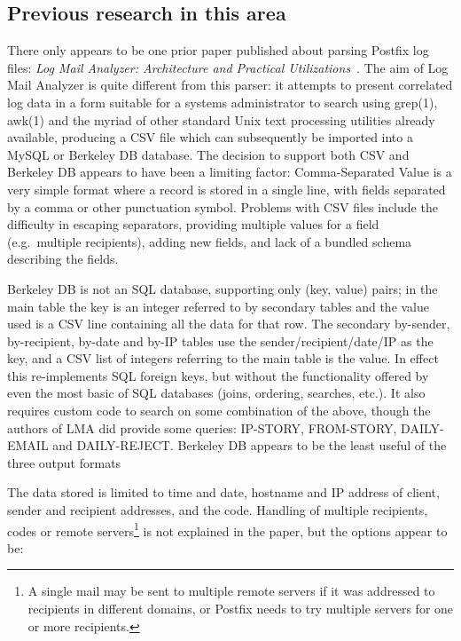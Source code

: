 \documentclass[a4paper,12pt,draft]{article}
\begin{document}
\subsection{Previous research in this area}

\label{prior art}

There only appears to be one prior paper published about parsing Postfix
log files: \textit{Log Mail Analyzer: Architecture and Practical
Utilizations\/}~\cite{log-mail-analyser}.  The aim of Log Mail Analyzer is
quite different from this parser: it attempts to present correlated log
data in a form suitable for a systems administrator to search using
grep(1), awk(1) and the myriad of other standard Unix text processing
utilities already available, producing a CSV file which can subsequently be
imported into a MySQL or Berkeley DB database.  The decision to support
both CSV and Berkeley DB appears to have been a limiting factor:
Comma-Separated Value is a very simple format where a record is stored in a
single line, with fields separated by a comma or other punctuation symbol.
Problems with CSV files include the difficulty in escaping separators,
providing multiple values for a field (e.g.\ multiple recipients), adding
new fields, and lack of a bundled schema describing the fields.

Berkeley DB is not an SQL database, supporting only (key, value) pairs; in
the main table the key is an integer referred to by secondary tables and
the value used is a CSV line containing all the data for that row.  The
secondary by-sender, by-recipient, by-date and by-IP tables use the
sender/recipient/date/IP as the key, and a CSV list of integers referring
to the main table is the value.  In effect this re-implements SQL foreign
keys, but without the functionality offered by even the most basic of SQL
databases (joins, ordering, searches, etc.).  It also requires custom code
to search on some combination of the above, though the authors of LMA did
provide some queries: IP-STORY, FROM-STORY, DAILY-EMAIL and DAILY-REJECT\@.
Berkeley DB appears to be the least useful of the three output formats

The data stored is limited to time and date, hostname and IP address of
client, sender and recipient addresses, and the \SMTP{} code.  Handling of
multiple recipients, \SMTP{} codes or remote servers\footnote{A single mail
may be sent to multiple remote servers if it was addressed to recipients in
different domains, or Postfix needs to try multiple servers for one or more
recipients.} is not explained in the paper, but the options appear to be:
\end{document}
